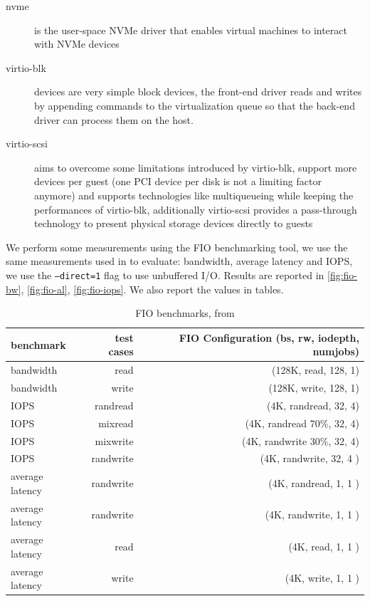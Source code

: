 \documentclass[twocolumn]{article}
\begin{document}
\begin{description}
    \item[nvme] is the user-space NVMe driver that enables virtual machines to interact with NVMe devices
    \item[virtio-blk] devices are very simple block devices, the front-end driver reads and writes by appending commands to the virtualization queue so that the back-end driver can process them on the host.
    \item[virtio-scsi] aims to overcome some limitations introduced by virtio-blk, support more devices per guest (one PCI device per disk is not a limiting factor anymore) and supports technologies like multiqueueing while keeping the performances of virtio-blk, additionally virtio-scsi provides a pass-through technology to present physical storage devices directly to guests
\end{description}

We perform some measurements using the FIO \cite{fio} benchmarking tool, we use the same measurements used in \cite{spool} to evaluate: bandwidth, average latency and IOPS, we use the \texttt{--direct=1} flag to use unbuffered I/O. Results are reported in \ref{fig:fio-bw}, \ref{fig:fio-al}, \ref{fig:fio-iops}. We also report the values in tables.

\begin{table}
    \centering
    \begin{tabular}{l|r|r}
        \hline
        \textbf{benchmark} & \textbf{test cases} & \textbf{FIO Configuration (bs, rw, iodepth, numjobs)} \\
        \hline
        bandwidth          &  read               & (128K, read, 128, 1)                                  \\
        bandwidth          & write               & (128K, write, 128, 1)                                 \\
        IOPS               &  randread           &(4K, randread, 32, 4)                                  \\
        IOPS               & mixread             & (4K, randread 70\%, 32, 4)                            \\
        IOPS               &  mixwrite           & (4K, randwrite 30\%, 32, 4)                           \\
        IOPS               &  randwrite          &  (4K, randwrite, 32, 4 )                              \\
        average latency    &  randwrite          & (4K, randread, 1, 1 )                                 \\
        average latency    &  randwrite          & (4K, randwrite, 1, 1 )                                \\
        average latency    &  read               &(4K, read, 1, 1 )                                      \\
        average latency    &  write	             & (4K, write, 1, 1 )                                    \\
    \end{tabular}
    \caption{FIO benchmarks, from \cite{spool}} 
    \label{tab:fio-benchmarks}
\end{table}
\end{document}
